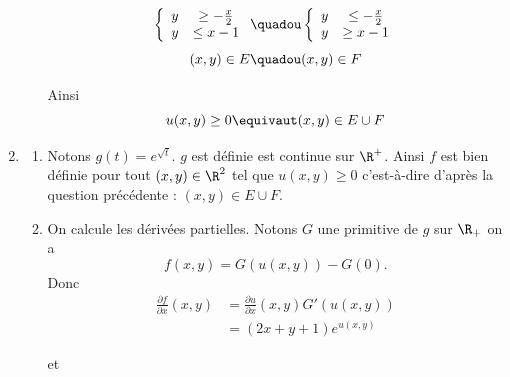 \begin{correction}
\begin{enumerate}
\begin{enumerate}
$$\left\{ 
\begin{array}{cc}
y &\geq -\frac{x}{2}\\
y&\leq x-1
\end{array}\right. 
\quadou 
\left\{ 
\begin{array}{cc}
y &\leq -\frac{x}{2}\\
y&\geq x-1
\end{array}\right.$$
$$(x,y)\in E \quadou (x,y)\in F$$

Ainsi $$u(x,y)\geq 0 \equivaut (x,y) \in E\cup F$$



\end{enumerate}
\item \begin{enumerate}
\item Notons $g(t) = e^{\sqrt{t}}$. $g$ est définie est continue sur $\R^+$. Ainsi $f$ est bien définie pour tout $(x,y)\in \R^2$ tel que $u(x,y) \geq 0$ c'est-à-dire d'après la question précédente : $(x,y)\in E\cup F$. 
\item On calcule les dérivées partielles. Notons $G$  une primitive de $g$ sur $\R_+$ on  a 
$$f(x,y) = G(u(x,y)) -G(0).$$
Donc 
\begin{align*}
\frac{\partial f}{\partial x} (x,y) &= \frac{\partial u}{\partial x} (x,y) G'(u(x,y))\\
												&= (2x+y +1)e^{u(x,y)}
\end{align*}

et 


\end{enumerate}
\end{enumerate}
\end{correction}
